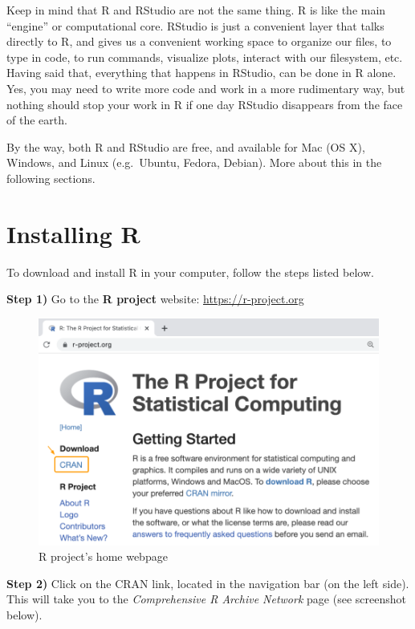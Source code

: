 \documentclass[
]{book}
\begin{document}
Keep in mind that R and RStudio are not the same thing. R is like the main\\
``engine'' or computational core. RStudio is just a convenient layer that
talks directly to R, and gives us a convenient working space to organize our
files, to type in code, to run commands, visualize plots, interact with our
filesystem, etc. Having said that, everything that happens in RStudio, can
be done in R alone. Yes, you may need to write more code and work in a more
rudimentary way, but nothing should stop your work in R if one day RStudio
disappears from the face of the earth.

By the way, both R and RStudio are free, and available for Mac (OS X), Windows,
and Linux (e.g.~Ubuntu, Fedora, Debian). More about this in the following
sections.

\hypertarget{installing-r}{%
\section{Installing R}\label{installing-r}}

To download and install R in your computer, follow the steps listed below.

\textbf{Step 1)} Go to the \textbf{R project} website: \url{https://r-project.org}

\begin{figure}

{\centering \includegraphics[width=0.7\linewidth]{images/install/r-project} 

}

\caption{R project's home webpage}\label{fig:unnamed-chunk-5}
\end{figure}

\textbf{Step 2)} Click on the CRAN link, located in the navigation bar (on the left
side). This will take you to the \emph{Comprehensive R Archive Network} page (see
screenshot below).
\end{document}
